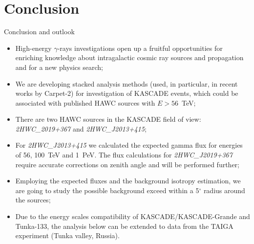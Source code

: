 \section{Conclusion}

\begin{frame}{Conclusion and outlook}
\small\vspace{-1.3ex}
\begin{itemize}
\setlength{\itemsep}{0pt}
\setlength{\parsep}{0pt}
\setlength{\parskip}{0pt}
  \item High-energy $\gamma$-rays investigations open up a fruitful opportunities for enriching knowledge about intragalactic cosmic ray sources and propagation and for a new physics search;
  \item We are developing stacked analysis methods (used, in particular, in recent works by Carpet-2) for investigation of KASCADE events, which could be associated with published HAWC sources with $E > 56$~TeV;
  \item There are two HAWC sources in the KASCADE field of view: \textit{2HWC\_2019+367} and \textit{2HWC\_J2013+415};
  \item For \textit{2HWC\_J2013+415} we calculated the expected gamma flux for energies of 56, 100~TeV and 1~PeV. The flux calculations for \textit{2HWC\_J2019+367} require accurate corrections on zenith angle and will be performed further;
  \item Employing the expected fluxes and the background isotropy estimation, we are going to study the possible background exceed within a 5$^\circ$ radius around the sources;
  \item Due to the energy scales compatibility of KASCADE/KASCADE-Grande and Tunka-133, the analysis below can be extended to data from the TAIGA experiment (Tunka valley, Russia).
\end{itemize}
\end{frame}

